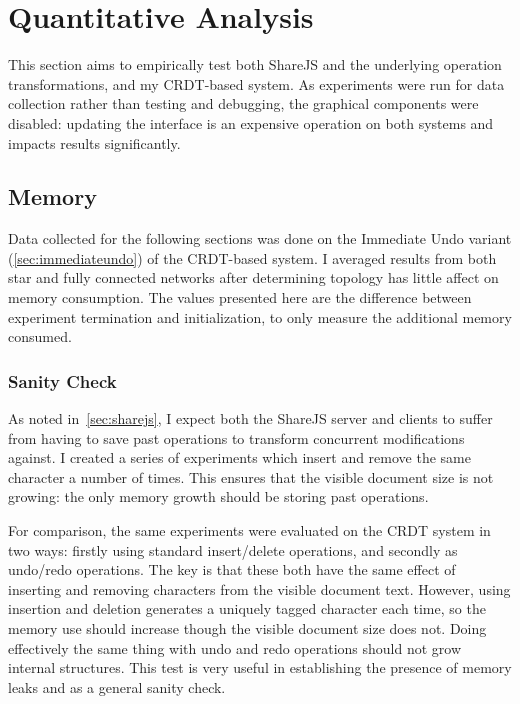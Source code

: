 \documentclass[12pt,a4paper,twoside,openright]{report}
\begin{document}
	
	
	
	\section{Quantitative Analysis} \label{sec:quanteval}
	
		This section aims to empirically test both ShareJS and the underlying operation transformations, and my CRDT-based system. As experiments were run for data collection rather than testing and debugging, the graphical components were disabled: updating the interface is an expensive operation on both systems and impacts results significantly.
		
		
			
		\subsection{Memory}
			Data collected for the following sections was done on the Immediate Undo variant (\cref{sec:immediateundo}) of the CRDT-based system. I averaged results from both star and fully connected networks after determining topology has little affect on memory consumption. The values presented here are the difference between experiment termination and initialization, to only measure the additional memory consumed.
		
			\subsubsection{Sanity Check} \label{sec:sanitycheck}
				As noted in~\cref{sec:sharejs}, I expect both the ShareJS server and clients to suffer from having to save past operations to transform concurrent modifications against. I created a series of experiments which insert and remove the same character a number of times. This ensures that the visible document size is not growing: the only memory growth should be storing past operations. 
				
				For comparison, the same experiments were evaluated on the CRDT system in two ways: firstly using standard insert/delete operations, and secondly as undo/redo operations. The key is that these both have the same effect of inserting and removing characters from the visible document text. However, using insertion and deletion generates a uniquely tagged character each time, so the memory use should increase though the visible document size does not. Doing effectively the same thing with undo and redo operations should not grow internal structures. This test is very useful in establishing the presence of memory leaks and as a general sanity check.
						
\end{document}
